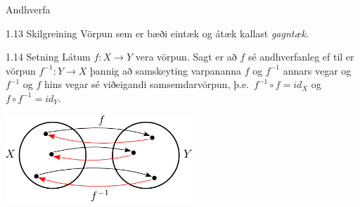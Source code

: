 \documentclass[icelandic,a4paper,12pt]{article}
\begin{document}
\begin{frame}{Andhverfa}
 \begin{block}{1.13 Skilgreining}
  Vörpun sem er bæði eintæk og átæk kallast \emph{gagntæk}.
 \end{block}

 \pause
 
\begin{block}{1.14 Setning}
 Látum $f:X \to Y$ vera vörpun. Sagt er að 
$f$ sé andhverfanleg ef til er vörpun 
$f^{-1}:Y \to X$
þannig að samskeyting varpananna $f$ og 
$f^{-1}$ annars vegar og 
$f^{-1}$ og 
$f$ hins vegar sé viðeigandi 
samsemdarvörpun, þ.e.~$f^{-1}\circ f=id_X$ og
$f\circ f^{-1} = id_Y$.
\end{block}

% 
% 
\begin{center}
 \includegraphics[width=7cm,keepaspectratio=true]{./myndir/kafli01/02_Andhverfa.png}
\end{center}

\end{frame}
\end{document}
